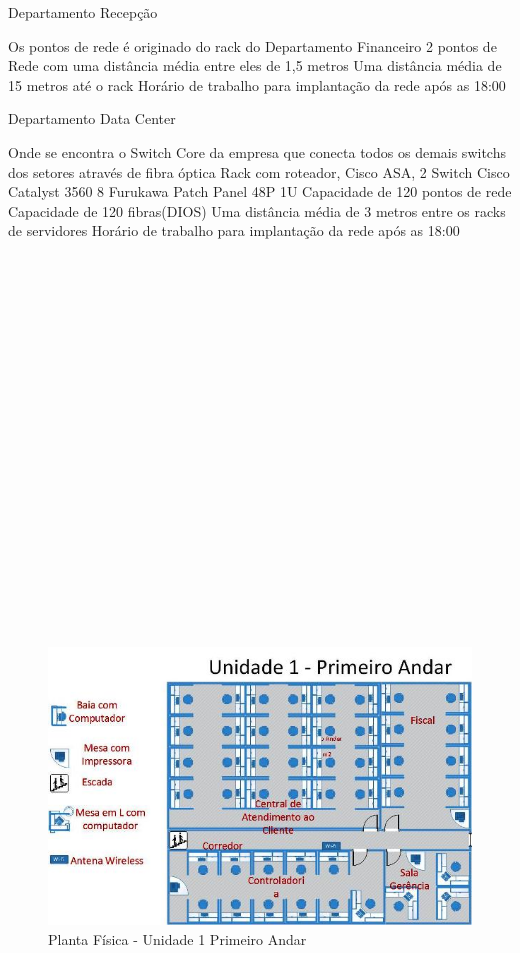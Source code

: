 \documentclass[	DIV=calc,%
							paper=a4,%
							fontsize=12pt,%
							onecolumn]{scrartcl}	 					%
\begin{document}
	 Departamento Recepção

Os pontos de rede é originado do rack do Departamento Financeiro
2 pontos de Rede com uma distância média entre eles de 1,5 metros
Uma distância média de 15 metros até o rack
Horário de trabalho para implantação da rede após as 18:00

	 Departamento Data Center

Onde se encontra o Switch Core da empresa que conecta todos os demais switchs dos setores através de fibra óptica
Rack com roteador, Cisco ASA, 2 Switch Cisco Catalyst 3560
8 Furukawa Patch Panel 48P 1U
Capacidade de 120 pontos de rede
Capacidade de 120 fibras(DIOS)
Uma distância média de 3 metros entre os racks de servidores
Horário de trabalho para implantação da rede após as 18:00
\\
\\
\\
\\
\\
\\
\\
\\
\\
\\
\\
\\
\\
\\
\\
\\
\\
\\
\\
\\
\\
\begin{figure}
	\centering
	\includegraphics[]{fig3}
	\caption{Planta Física - Unidade 1 Primeiro Andar}
	\label{fig3}
\end{figure}
\end{document}
